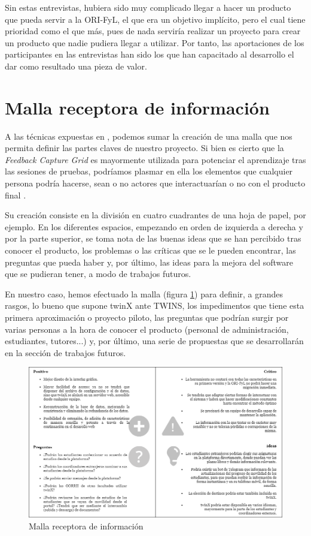 Sin estas entrevistas, hubiera sido muy complicado llegar a hacer un producto que pueda servir a la ORI-FyL, el que era un objetivo implícito, pero el cual tiene prioridad como el que más, pues de nada serviría realizar un proyecto para crear un producto que nadie pudiera llegar a utilizar. Por tanto, las aportaciones de los participantes en las entrevistas han sido los que han capacitado al desarrollo el dar como resultado una pieza de valor.

\section{Malla receptora de información}

A las técnicas expuestas en , podemos sumar la creación de una malla que nos permita definir las partes claves de nuestro proyecto. Si bien es cierto que la \textit{Feedback Capture Grid} es mayormente utilizada para potenciar el aprendizaje tras las sesiones de pruebas, podríamos plasmar en ella los elementos que cualquier persona podría hacerse, sean o no actores que interactuarían o no con el producto final \cite{feedbackCaptureGrid}.

Su creación consiste en la división en cuatro cuadrantes de una hoja de papel, por ejemplo. En los diferentes espacios, empezando en orden de izquierda a derecha y por la parte superior, se toma nota de las buenas ideas que se han percibido tras conocer el producto, los problemas o las críticas que se le pueden encontrar, las preguntas que pueda haber y, por último, las ideas para la mejora del software que se pudieran tener, a modo de trabajos futuros.

En nuestro caso, hemos efectuado la malla (figura \ref{fig:malla}) para definir, a grandes rasgos, lo bueno que supone twinX ante TWINS, los impedimentos que tiene esta primera aproximación o proyecto piloto, las preguntas que podrían surgir por varias personas a la hora de conocer el producto (personal de administración, estudiantes, tutores...) y, por último, una serie de propuestas que se desarrollarán en la sección de trabajos futuros.


\begin{figure}
	\centering
	\includegraphics[width=\textwidth]{img/malla.png}
	\caption{Malla receptora de información}
	\label{fig:malla}
\end{figure}


